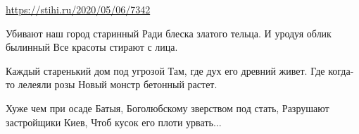  
 
 
 
 
\url{https://stihi.ru/2020/05/06/7342}

Убивают наш город старинный
Ради блеска златого тельца.
И уродуя облик былинный
Все красоты стирают с лица.

Каждый старенький дом под угрозой
Там, где дух его древний живет.
Где когда-то лелеяли розы
Новый монстр бетонный растет.

Хуже чем при осаде Батыя,
Боголюбскому зверством под стать,
Разрушают застройщики Киев,
Чтоб кусок его плоти урвать...
